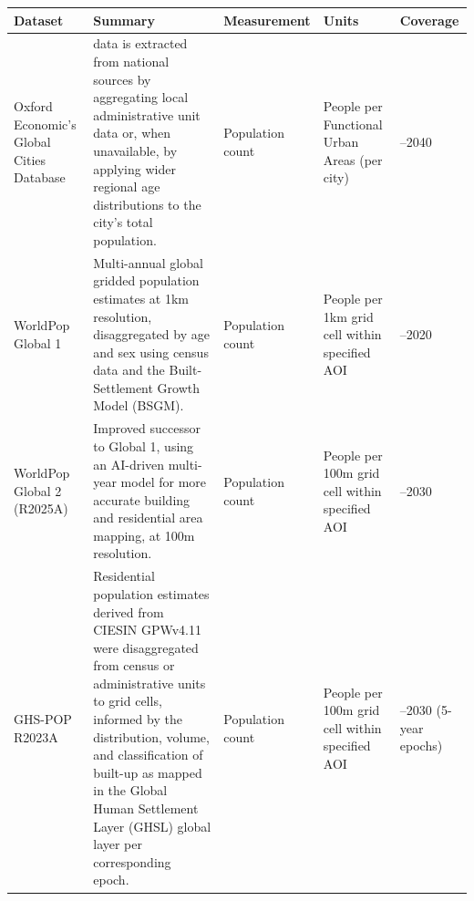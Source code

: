 \documentclass[
  letterpaper,
  DIV=11,
  numbers=noendperiod]{scrreprt}
\newcounter{none} %
\begin{document}
{\def\LTcaptype{none} %
\begin{longtable}[]{@{}
  >{\raggedright\arraybackslash}p{}
  >{\raggedright\arraybackslash}p{}
  >{\raggedright\arraybackslash}p{}
  >{\raggedright\arraybackslash}p{}
  >{\raggedright\arraybackslash}p{}@{}}
\toprule\noalign{}
\begin{minipage}[b]{\linewidth}\raggedright
Dataset
\end{minipage} & \begin{minipage}[b]{\linewidth}\raggedright
Summary
\end{minipage} & \begin{minipage}[b]{\linewidth}\raggedright
Measurement
\end{minipage} & \begin{minipage}[b]{\linewidth}\raggedright
Units
\end{minipage} & \begin{minipage}[b]{\linewidth}\raggedright
Coverage
\end{minipage} \\
\midrule\noalign{}
\endhead
\bottomrule\noalign{}
\endlastfoot
Oxford Economic's Global Cities Database & data is extracted from
national sources by aggregating local administrative unit data or, when
unavailable, by applying wider regional age distributions to the city's
total population. & Population count & People per Functional Urban Areas
(per city) & 2000--2040 \\
WorldPop Global 1 & Multi-annual global gridded population estimates at
1km resolution, disaggregated by age and sex using census data and the
Built-Settlement Growth Model (BSGM). & Population count & People per
1km grid cell within specified AOI & 2000--2020 \\
WorldPop Global 2 (R2025A) & Improved successor to Global 1, using an
AI-driven multi-year model for more accurate building and residential
area mapping, at 100m resolution. & Population count & People per 100m
grid cell within specified AOI & 2015--2030 \\
GHS-POP R2023A & Residential population estimates derived from CIESIN
GPWv4.11 were disaggregated from census or administrative units to grid
cells, informed by the distribution, volume, and classification of
built-up as mapped in the Global Human Settlement Layer (GHSL) global
layer per corresponding epoch. & Population count & People per 100m grid
cell within specified AOI & 1975--2030 (5-year epochs) \\
\end{longtable}
}
\end{document}

